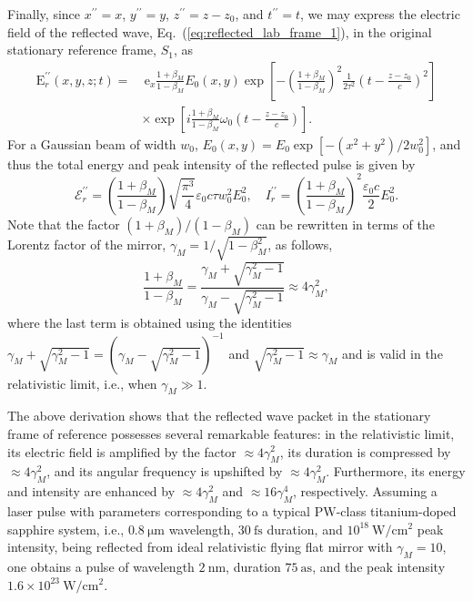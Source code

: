 \documentclass[10pt, a4paper, twoside, openright]{report}
\renewcommand{\vec}[1]{\boldsymbol{\mathrm{#1}}}
\begin{document}
Finally, since $ x^{\prime \prime} = x $, $ y^{\prime \prime} = y $, $ z^{\prime \prime} = z - z_0 $, and $ t^{\prime \prime} = t $,
we may express the electric field of the reflected wave, Eq.~(\ref{eq:reflected_lab_frame_1}), in the original stationary reference frame, $ S_1 $, as
\begin{equation}\label{eq:reflected_lab_frame_2}
\begin{split}
\vec{E}^{\prime \prime}_r \left(x, y, z; t \right) = & \ \vec{e}_x \frac{1 + \beta_M}{1 - \beta_M} E_0 \left(x, y \right) \exp \left[ - \left(\frac{1 + \beta_M}{1 - \beta_M}\right)^2 \frac{1}{2 \tau^2} \left(t - \frac{z - z_0}{c}\right)^2 \right] \\ 
& \times \exp \left[ i \frac{1 + \beta_M}{1 - \beta_M} \omega_0 \left(t - \frac{z - z_0}{c}\right) \right].
\end{split}
\end{equation}
For a Gaussian beam of width $ w_0 $, $ E_0 \left( x, y \right) = E_0 \exp \left[-\left( x^2 + y^2 \right) / 2 w_0^2 \right] $, and thus the total energy and peak intensity of the reflected pulse is given by 
\begin{equation}\label{eq:energy_and_intensity}
\mathcal{E}^{\prime \prime}_r = \left(\frac{1 + \beta_M}{1 - \beta_M}\right) \sqrt{\frac{\pi^3}{4}} \varepsilon_0 c \tau w_0^2 E_0^2 , \quad I^{\prime \prime}_r = \left(\frac{1 + \beta_M}{1 - \beta_M}\right)^2 \frac{\varepsilon_0 c}{2} E_0^2.
\end{equation}
Note that the factor $ \left(1 + \beta_M \right) / \left(1 - \beta_M \right) $ can be rewritten in terms of the Lorentz factor of the mirror, $ \gamma_M = 1 / \sqrt{1 - \beta_M^2} $, as follows,
\begin{equation}\label{eq:factor}
\frac{1 + \beta_M}{1 - \beta_M} = \frac{\gamma_M + \sqrt{\gamma_M^2 - 1}}{\gamma_M - \sqrt{\gamma_M^2 - 1}} \approx 4 \gamma_M^2,
\end{equation}
where the last term is obtained using the identities $ \gamma_M + \sqrt{\gamma_M^2 - 1} = ( \gamma_M - \sqrt{\gamma_M^2 - 1} )^{-1} $ and $ \sqrt{\gamma_M^2 - 1} \approx \gamma_M $ and is valid in the relativistic limit, i.e., when $ \gamma_M \gg 1 $.

The above derivation shows that the reflected wave packet in the stationary frame of reference possesses several remarkable features: in the relativistic limit, its electric field is amplified by the factor $ \approx 4 \gamma_M^2 $, its duration is compressed by $ \approx 4 \gamma_M^2 $, and its angular frequency is upshifted by $ \approx 4 \gamma_M^2 $. Furthermore, its energy and intensity are enhanced by $ \approx 4 \gamma_M^2 $ and $ \approx 16 \gamma_M^4 $, respectively. Assuming a laser pulse with parameters corresponding to a typical $ \mathrm{PW} $-class titanium-doped sapphire system, i.e., $ 0.8 \ \mathrm{\mu m} $ wavelength, $ 30 \ \mathrm{fs} $ duration, and $ 10^{18} \ \mathrm{W / cm^2} $ peak intensity, being reflected from ideal relativistic flying flat mirror with $ \gamma_M = 10 $, one obtains a pulse of wavelength $ 2 \ \mathrm{nm} $, duration $ 75 \ \mathrm{as} $, and the peak intensity $ 1.6 \times 10^{23} \ \mathrm{W / cm^2} $.
\end{document}
